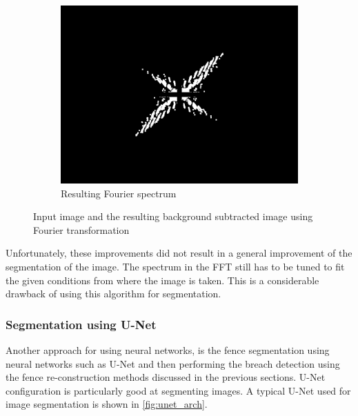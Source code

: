 \documentclass[../Head/Main.tex]{subfiles}
\begin{document}
\begin{figure}[H]
    \begin{subfigure}{.32\textwidth}
        \centering
        \includegraphics[width=\textwidth]{../Figures/fouriermultipledbymask.png}
        \caption{Resulting Fourier spectrum}
        \label{fig:fourier_spectrum_multiplied_with_mask}
    \end{subfigure}
    \caption{Input image and the resulting background subtracted image using Fourier transformation}
    \label{fig:fourier_improments}
\end{figure}

Unfortunately, these improvements did not result in a general improvement of the segmentation of the image. The spectrum in the FFT still has to be tuned to fit the given conditions from where the image is taken. This is a considerable drawback of using this algorithm for segmentation. 
\clearpage

\subsubsection{Segmentation using U-Net}
\label{seg:deep_learning_segmentaion}
Another approach for using neural networks, is the fence segmentation using neural networks such as U-Net and then performing the breach detection using the fence re-construction methods discussed in the previous sections. U-Net configuration is particularly good at segmenting images. A typical U-Net used for image segmentation is shown in \autoref{fig:unet_arch}. 
\end{document}
